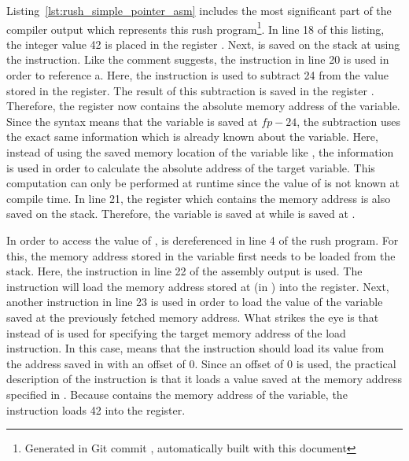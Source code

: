 Listing~\ref{lst:rush_simple_pointer_asm} includes the most significant part of the compiler output which represents this rush program\footnote{Generated in Git commit \rushCommit, automatically built with this document}.
In line 18 of this listing, the integer value 42 is placed in the register .
Next,  is saved on the stack at  using the  instruction.
Like the comment suggests, the instruction in line 20 is used in order to reference a.
Here, the  instruction is used to subtract 24 from the value stored in the  register.
The result of this subtraction is saved in the register .
Therefore, the register now contains the absolute memory address of the  variable.
Since the syntax  means that the variable is saved at $fp - 24$, the subtraction uses the exact same information which is already known about the variable.
Here, instead of using the saved memory location of the variable like , the information is used in order to calculate the absolute address of the target variable.
This computation can only be performed at runtime since the value of  is not known at compile time.
In line 21, the  register which contains the memory address is also saved on the stack.
Therefore, the  variable is saved at  while  is saved at .

In order to access the value of ,  is dereferenced in line 4 of the rush program.
For this, the memory address stored in the variable  first needs to be loaded from the stack.
Here, the  instruction in line 22 of the assembly output is used.
The instruction will load the memory address stored at  (in ) into the  register.
Next, another  instruction in line 23 is used in order to load the value of the variable saved at the previously fetched memory address.
What strikes the eye is that  instead of  is used for specifying the target memory address of the load instruction.
In this case,  means that the instruction should load its value from the address saved in  with an offset of 0.
Since an offset of 0 is used, the practical description of the instruction is that it loads a value saved at the memory address specified in .
Because  contains the memory address of the  variable, the instruction loads 42 into the  register.

